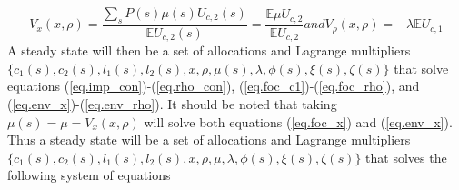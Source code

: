 \documentclass[thmsb,11pt]{article}
\begin{document}
\begin{subequations}
\begin{equation}
	V_x(x,\rho)= \frac{\sum_sP(s) \mu(s) U_{c,2}(s)}{\mathbb E U_{c,2}(s)} = \frac{\mathbb E\mu U_{c,2}}{\mathbb E U_{c,2}}\label{eq.env_x}
\end{equation}and
\begin{equation}
	V_{\rho}(x,\rho) = -\lambda \mathbb E U_{c,1}\label{eq.env_rho}
\end{equation}\end{subequations}  A steady state will then be a set of allocations and Lagrange multipliers $\{c_1(s),c_2(s),l_1(s),l_2(s),x,\rho,\mu(s),\lambda,\phi(s),\xi(s),\zeta(s)\}$  that solve equations (\ref{eq.imp_con})-(\ref{eq.rho_con}), (\ref{eq.foc_c1})-(\ref{eq.foc_rho}), and (\ref{eq.env_x})-(\ref{eq.env_rho}).  It should be noted that taking $\mu(s) = \mu = V_x(x,\rho)$ will solve both equations (\ref{eq.foc_x}) and (\ref{eq.env_x}).  Thus a steady state will be a set of allocations and Lagrange multipliers $\{c_1(s),c_2(s),l_1(s),l_2(s),x,\rho,\mu,\lambda,\phi(s),\xi(s),\zeta(s)\}$ that solves the following system of equations
\end{document}
